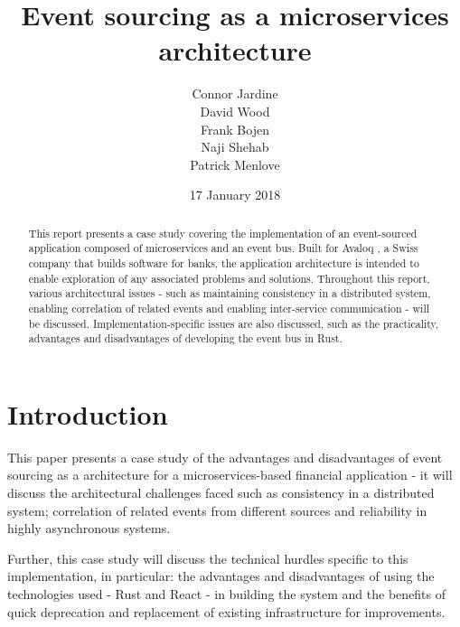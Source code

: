\documentclass{l3proj}
\begin{document}
\title{Event sourcing as a microservices architecture}
\author{Connor Jardine \\
        David Wood \\
        Frank Bojen \\
        Naji Shehab \\
        Patrick Menlove}
\date{17 January 2018}
\maketitle

\begin{abstract}
This report presents a case study covering the implementation of an event-sourced application composed of microservices and an event bus. Built for Avaloq \cite{avaloq}, a Swiss company that builds software for banks, the application architecture is intended to enable exploration of any associated problems and solutions. Throughout this report, various architectural issues - such as maintaining consistency in a distributed system, enabling correlation of related events and enabling inter-service communication - will be discussed. Implementation-specific issues are also discussed, such as the practicality, advantages and disadvantages of developing the event bus in Rust.
\end{abstract}
\educationalconsent

\newpage
\tableofcontents

\newpage
\section{Introduction}
\label{sec:introduction}
This paper presents a case study of the advantages and disadvantages of event sourcing as a architecture for a microservices-based financial application - it will discuss the architectural challenges faced such as consistency in a distributed system; correlation of related events from different sources and reliability in highly asynchronous systems.

Further, this case study will discuss the technical hurdles specific to this implementation, in particular: the advantages and disadvantages of using the technologies used - Rust and React - in building the system and the benefits of quick deprecation and replacement of existing infrastructure for improvements.
\end{document}
